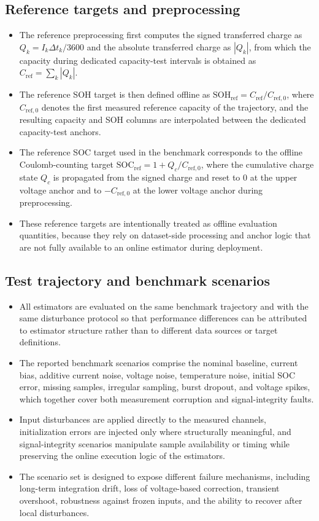 \documentclass[review]{elsarticle}
\begin{document}
\subsection{Reference targets and preprocessing}
\begin{itemize}[leftmargin=*]
    \item The reference preprocessing first computes the signed transferred charge as $Q_k = I_k \Delta t_k / 3600$ and the absolute transferred charge as $|Q_k|$, from which the capacity during dedicated capacity-test intervals is obtained as $C_{\mathrm{ref}} = \sum_k |Q_k|$.
    \item The reference SOH target is then defined offline as $\mathrm{SOH}_{\mathrm{ref}} = C_{\mathrm{ref}} / C_{\mathrm{ref},0}$, where $C_{\mathrm{ref},0}$ denotes the first measured reference capacity of the trajectory, and the resulting capacity and SOH columns are interpolated between the dedicated capacity-test anchors.
    \item The reference SOC target used in the benchmark corresponds to the offline Coulomb-counting target $\mathrm{SOC}_{\mathrm{ref}} = 1 + Q_c / C_{\mathrm{ref},0}$, where the cumulative charge state $Q_c$ is propagated from the signed charge and reset to $0$ at the upper voltage anchor and to $-C_{\mathrm{ref},0}$ at the lower voltage anchor during preprocessing.
    \item These reference targets are intentionally treated as offline evaluation quantities, because they rely on dataset-side processing and anchor logic that are not fully available to an online estimator during deployment.
\end{itemize}

\subsection{Test trajectory and benchmark scenarios}
\begin{itemize}[leftmargin=*]
    \item All estimators are evaluated on the same benchmark trajectory and with the same disturbance protocol so that performance differences can be attributed to estimator structure rather than to different data sources or target definitions.
    \item The reported benchmark scenarios comprise the nominal baseline, current bias, additive current noise, voltage noise, temperature noise, initial SOC error, missing samples, irregular sampling, burst dropout, and voltage spikes, which together cover both measurement corruption and signal-integrity faults.
    \item Input disturbances are applied directly to the measured channels, initialization errors are injected only where structurally meaningful, and signal-integrity scenarios manipulate sample availability or timing while preserving the online execution logic of the estimators.
    \item The scenario set is designed to expose different failure mechanisms, including long-term integration drift, loss of voltage-based correction, transient overshoot, robustness against frozen inputs, and the ability to recover after local disturbances.
\end{itemize}
\end{document}
